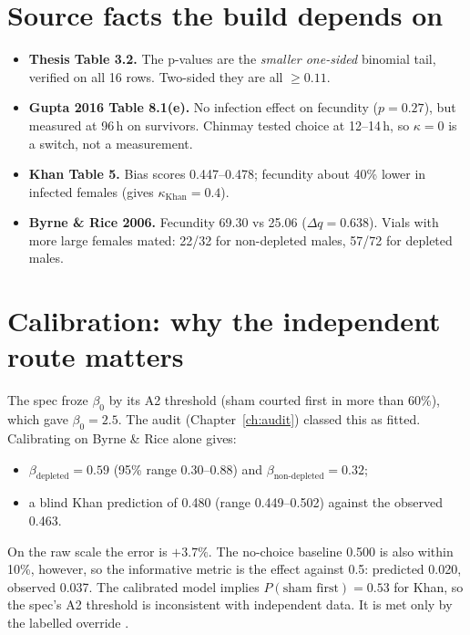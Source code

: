 \section{Source facts the build depends on}
\begin{itemize}
\item \textbf{Thesis Table 3.2.} The p-values are the \emph{smaller one-sided} binomial tail, verified on all 16 rows. Two-sided they are all $\ge0.11$.
\item \textbf{Gupta 2016 Table 8.1(e).} No infection effect on fecundity ($p=0.27$), but measured at 96\,h on survivors. Chinmay tested choice at 12--14\,h, so $\kappa=0$ is a switch, not a measurement.
\item \textbf{Khan Table 5.} Bias scores 0.447--0.478; fecundity about 40\% lower in infected females (gives $\kappa_\text{Khan}=0.4$).
\item \textbf{Byrne \& Rice 2006.} Fecundity 69.30 vs 25.06 ($\Delta q=0.638$). Vials with more large females mated: 22/32 for non-depleted males, 57/72 for depleted males.
\end{itemize}

\section{Calibration: why the independent route matters}
The spec froze $\beta_0$ by its A2 threshold (sham courted first in more than 60\%), which gave $\beta_0=2.5$. The audit (Chapter~\ref{ch:audit}) classed this as fitted. Calibrating on Byrne \& Rice alone gives:
\begin{itemize}
\item $\beta_\text{depleted}=0.59$ (95\% range 0.30--0.88) and $\beta_\text{non-depleted}=0.32$;
\item a blind Khan prediction of 0.480 (range 0.449--0.502) against the observed 0.463.
\end{itemize}
On the raw scale the error is $+3.7\%$. The no-choice baseline 0.500 is also within 10\%, however, so the informative metric is the effect against 0.5: predicted 0.020, observed 0.037. The calibrated model implies $P(\text{sham first})=0.53$ for Khan, so the spec's A2 threshold is inconsistent with independent data. It is met only by the labelled override .

